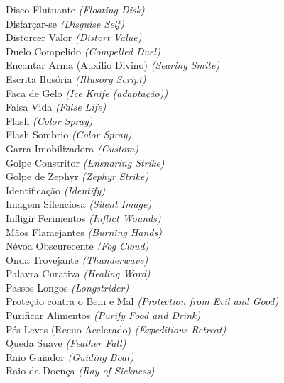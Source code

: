 \documentclass{RPG_Adventure}[2021/10/20]
\begin{document}
{\normalsize Disco Flutuante \textit{(Floating Disk)}\\ }
{\normalsize Disfarçar-se \textit{(Disguise Self)}\\ }
{\normalsize Distorcer Valor \textit{(Distort Value)}\\ }
{\normalsize Duelo Compelido \textit{(Compelled Duel)}\\ }
{\normalsize Encantar Arma (Auxílio Divino) \textit{(Searing Smite)}\\ }
{\normalsize Escrita Ilusória \textit{(Illusory Script)}\\ }
{\normalsize Faca de Gelo \textit{(Ice Knife (adaptação))}\\ }
{\normalsize Falsa Vida \textit{(False Life)}\\ }
{\normalsize Flash \textit{(Color Spray)}\\ }
{\normalsize Flash Sombrio \textit{(Color Spray)}\\ }
{\normalsize Garra Imobilizadora \textit{(Custom)}\\ }
{\normalsize Golpe Constritor \textit{(Ensnaring Strike)}\\ }
{\normalsize Golpe de Zephyr \textit{(Zephyr Strike)}\\ }
{\normalsize Identificação \textit{(Identify)}\\ }
{\normalsize Imagem Silenciosa \textit{(Silent Image)}\\ }
{\normalsize Infligir Ferimentos \textit{(Inflict Wounds)}\\ }
{\normalsize Mãos Flamejantes \textit{(Burning Hands)}\\ }
{\normalsize Névoa Obscurecente \textit{(Fog Cloud)}\\ }
{\normalsize Onda Trovejante \textit{(Thunderwave)}\\ }
{\normalsize Palavra Curativa \textit{(Healing Word)}\\ }
{\normalsize Passos Longos \textit{(Longstrider)}\\ }
{\normalsize Proteção contra o Bem e Mal \textit{(Protection from Evil and Good)}\\ }
{\normalsize Purificar Alimentos \textit{(Purify Food and Drink)}\\ }
{\normalsize Pés Leves (Recuo Acelerado) \textit{(Expeditious Retreat)}\\ }
{\normalsize Queda Suave \textit{(Feather Fall)}\\ }
{\normalsize Raio Guiador \textit{(Guiding Boat)}\\ }
{\normalsize Raio da Doença \textit{(Ray of Sickness)}\\ }
\end{document}
